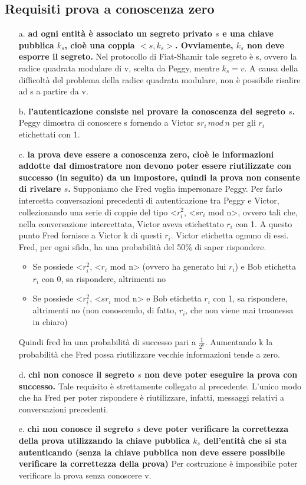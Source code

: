 \subsection{Requisiti prova a conoscenza zero}
\begin{itemize}
\item[a.] \textbf{ad ogni entità è associato un segreto privato $s$ e una chiave pubblica $k_{s}$, cioè una coppia $<s, k_{s}>$. Ovviamente, $k_{s}$ non deve esporre il segreto.} Nel protocollo di Fiat-Shamir tale segreto è s, ovvero la radice quadrata modulare di v, scelta da Peggy, mentre $k_s = v$. A causa della difficoltà del problema della radice quadrata modulare, non è possibile risalire ad s a partire da v.
\item[b.] \textbf{l'autenticazione consiste nel provare la conoscenza del segreto $s$.} Peggy dimostra di conoscere s fornendo a Victor $sr_{i} \, mod \, n$ per gli $r_{i}$ etichettati con 1.
\item[c.] \textbf{la prova deve essere a conoscenza zero, cioè le informazioni addotte dal dimostratore non devono poter essere riutilizzate con successo (in seguito) da un impostore, quindi la prova non consente di rivelare $s$.} Supponiamo che Fred voglia impersonare Peggy. Per farlo intercetta conversazioni precedenti di autenticazione tra Peggy e Victor, collezionando una serie di coppie del tipo <$r_{i}^2$, <$sr_{i}$ mod n>, ovvero tali che, nella conversazione intercettata, Victor aveva etichettato $r_i$ con 1. A questo punto Fred fornisce a Victor k di questi $r_{i}$. Victor etichetta ognuno di essi. Fred, per ogni sfida, ha una probabilità del 50\% di saper rispondere. 
	\begin{itemize}
	\item Se possiede <$r_{i}^2$, <$r_{i}$ mod n> (ovvero ha generato lui $r_i$) e Bob etichetta $r_i$ con 0, sa rispondere, altrimenti no
	\item Se possiede <$r_{i}^2$, <$sr_{i}$ mod n> e Bob etichetta $r_i$ con 1, sa rispondere, altrimenti no (non conoscendo, di fatto, $r_i$, che non viene mai trasmessa in chiaro)
	\end{itemize} 
Quindi fred ha una probabilità di successo pari a $\frac{1}{2^k}$. Aumentando k la probabilità che Fred possa riutilizzare vecchie informazioni tende a zero.
\item[d.] \textbf{chi non conosce il segreto $s$ non deve poter eseguire la prova con successo.} Tale requisito è strettamente collegato al precedente. L'unico modo che ha Fred per poter rispondere è riutilizzare, infatti, messaggi relativi a conversazioni precedenti.
\item[e.] \textbf{chi non conosce il segreto $s$ deve poter verificare la correttezza della prova utilizzando la chiave pubblica $k_{s}$ dell'entità che si sta autenticando (senza la chiave pubblica non deve essere possibile verificare la correttezza della prova)} Per costruzione è impossibile poter verificare la prova senza conoscere v.
\end{itemize}
 


